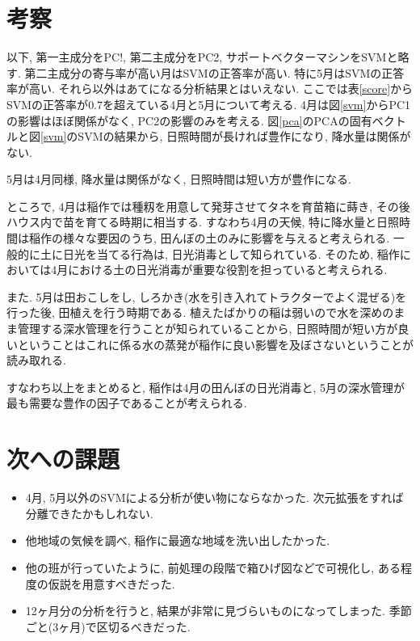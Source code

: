 \documentclass{jarticle}
\begin{document}
\hypertarget{header-n2056}{%
\section{考察}\label{header-n2056}}
以下, 第一主成分をPC!, 第二主成分をPC2, サポートベクターマシンをSVMと略す.
第二主成分の寄与率が高い月はSVMの正答率が高い. 特に5月はSVMの正答率が高い. それら以外はあてになる分析結果とはいえない. ここでは表\ref{score}からSVMの正答率が$0.7$を超えている4月と5月について考える. 
4月は図\ref{svm}からPC1の影響はほぼ関係がなく, PC2の影響のみを考える. 図\ref{pca}のPCAの固有ベクトルと図\ref{svm}のSVMの結果から, 日照時間が長ければ豊作になり, 降水量は関係がない.

5月は4月同様, 降水量は関係がなく, 日照時間は短い方が豊作になる.

ところで, 4月は稲作では種籾を用意して発芽させてタネを育苗箱に蒔き, その後ハウス内で苗を育てる時期に相当する. すなわち4月の天候, 特に降水量と日照時間は稲作の様々な要因のうち, 田んぼの土のみに影響を与えると考えられる. 一般的に土に日光を当てる行為は, 日光消毒として知られている. そのため, 稲作においては4月における土の日光消毒が重要な役割を担っていると考えられる.

また. 5月は田おこしをし, しろかき(水を引き入れてトラクターでよく混ぜる)を行った後, 田植えを行う時期である. 植えたばかりの稲は弱いので水を深めのまま管理する深水管理を行うことが知られていることから, 日照時間が短い方が良いということはこれに係る水の蒸発が稲作に良い影響を及ぼさないということが読み取れる.

すなわち以上をまとめると, 稲作は4月の田んぼの日光消毒と, 5月の深水管理が最も需要な豊作の因子であることが考えられる.


\section{次への課題}
\begin{itemize}
\item 4月, 5月以外のSVMによる分析が使い物にならなかった. 次元拡張をすれば分離できたかもしれない. 
\item 他地域の気候を調べ, 稲作に最適な地域を洗い出したかった.
\item 他の班が行っていたように, 前処理の段階で箱ひげ図などで可視化し, ある程度の仮説を用意すべきだった.
\item 12ヶ月分の分析を行うと, 結果が非常に見づらいものになってしまった. 季節ごと(3ヶ月)で区切るべきだった.
\end{itemize}
\end{document}
